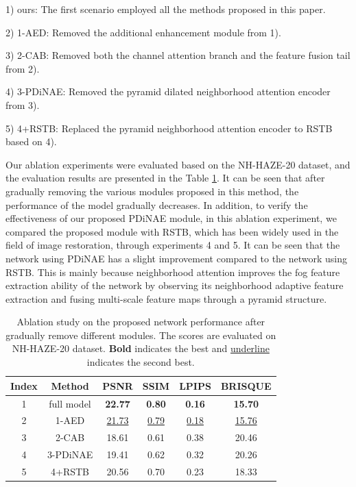 \documentclass[lettersize,journal]{IEEEtran}
\begin{document}
1) ours: The first scenario employed all the methods proposed in this paper.

2) 1-AED: Removed the additional enhancement module from 1).

3) 2-CAB: Removed both the channel attention branch and the feature fusion tail from 2).

4) 3-PDiNAE: Removed the pyramid dilated neighborhood attention encoder from 3).

5) 4+RSTB: Replaced the pyramid neighborhood attention encoder to RSTB\cite{liang2021swinir} based on 4).

Our ablation experiments were evaluated based on the NH-HAZE-20 dataset, and the evaluation results are presented in the Table \ref{Ablation_study_1}. It can be seen that after gradually removing the various modules proposed in this method, the performance of the model gradually decreases. In addition, to verify the effectiveness of our proposed PDiNAE module, in this ablation experiment, we compared the proposed module with RSTB, which has been widely used in the field of image restoration, through experiments 4 and 5. It can be seen that the network using PDiNAE has a slight improvement compared to the network using RSTB. This is mainly because neighborhood attention improves the fog feature extraction ability of the network by observing its neighborhood adaptive feature extraction and fusing multi-scale feature maps through a pyramid structure.

\begin{table}
	\begin{center}
		\caption{Ablation study on the proposed network performance after gradually remove different modules. The scores are evaluated on NH-HAZE-20 dataset. \textbf{Bold} indicates the best and \underline{underline} indicates the second best.}
		\label{Ablation_study_1}
		\begin{tabular}{c | c | c | c | c | c }
			\hline
			Index & Method & PSNR & SSIM & LPIPS & BRISQUE \\
			\hline
			1 & full model & \textbf{22.77} & \textbf{0.80} & \textbf{0.16} & \textbf{15.70} \\
			2 & 1-AED & \underline{21.73} & \underline{0.79} & \underline{0.18} & \underline{15.76} \\
			3 & 2-CAB & 18.61 & 0.61 & 0.38 & 20.46 \\
			4 & 3-PDiNAE & 19.41 & 0.62 & 0.32 & 20.26 \\
			5 & 4+RSTB & 20.56 & 0.70 & 0.23 & 18.33 \\
			\hline
		\end{tabular}
	\end{center}
\end{table}
\end{document}
